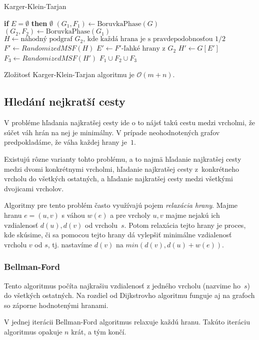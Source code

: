 \begin{algorithm}
\caption{Karger-Klein-Tarjan}
\begin{algorithmic}[1]
    \State \textbf{if} {$E = \emptyset$} \textbf{then} \Return $\emptyset$
    \State $(G_1, F_1) \gets \text{BoruvkaPhase}(G)$
	\State $(G_2, F_2) \gets \text{BoruvkaPhase}(G_1)$
	\State $H \gets \text{náhodný podgraf }G_2\text{, kde každá hrana je s pravdepodobnosťou }1/2$
	\State $F' \gets RandomizedMSF(H)$
	\State $E' \gets F'\text{-ľahké hrany z }G_2$
	\State $H' \gets G[E']$
	\State $F_3 \gets RandomizedMSF(H')$
    \State \Return $F_1 \cup F_2 \cup F_3$
\EndFunction
\end{algorithmic}
\end{algorithm}

Zložitosť Karger-Klein-Tarjan algoritmu je $\mathcal{O}(m+n)$.

\subsection{Hledání nejkratší cesty}

V probléme hľadania najkratšej cesty ide o to nájsť takú cestu
medzi vrcholmi, že súčet váh hrán na nej je minimálny. V prípade
neohodnotených grafov predpokladáme, že váha každej hrany je~$1$.

Existujú rôzne varianty tohto problému, a to najmä hľadanie najkratšej
cesty medzi dvomi konkrétnymi vrcholmi, hľadanie najkratšej cesty
z~konkrétneho vrcholu do všetkých ostatných, a hľadanie najkratšej
cesty medzi všetkými dvojicami vrcholov.

Algoritmy pre tento problém často využívajú pojem {\em relaxácia hrany}.
Majme hranu $e=(u,v)$ s váhou $w(e)$ a pre vrcholy $u,v$ majme nejakú
ich vzdialenosť $d(u), d(v)$ od vrcholu~$s$. Potom relaxácia tejto
hrany je proces, kde skúsime, či sa pomocou tejto hrany dá
vylepšiť minimálne vzdialenosť vrcholu $v$ od $s$, tj. nastavíme
$d(v)$ na $min(d(v),d(u)+w(e))$.

\subsubsection*{Bellman-Ford}
Tento algoritmus počíta najkrašiu vzdialenosť z jedného vrcholu
(nazvime ho~$s$) do všetkých ostatných. Na rozdiel od Dijkstrovho
algoritmu funguje aj na grafoch so záporne hodnotenými hranami.

V jednej iterácii Bellman-Ford algoritmus relaxuje každú hranu.
Takúto iteráciu algoritmus opakuje $n$ krát, a tým končí. 

